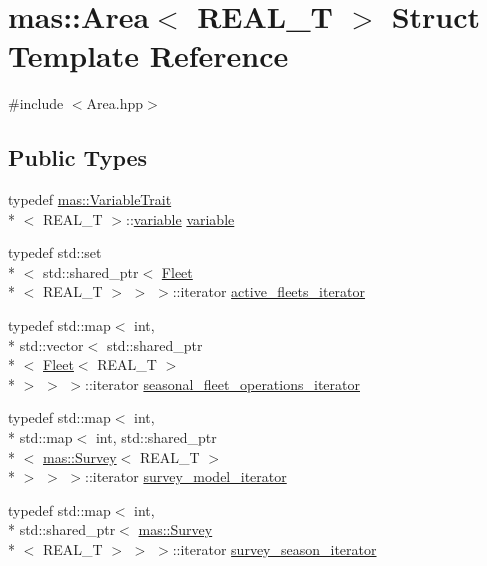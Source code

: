 \hypertarget{structmas_1_1_area}{\section{mas\-:\-:Area$<$ R\-E\-A\-L\-\_\-\-T $>$ Struct Template Reference}
\label{structmas_1_1_area}
}


{\ttfamily \#include $<$Area.\-hpp$>$}

\subsection*{Public Types}
\begin{DoxyCompactItemize}
\item 
typedef \hyperlink{structmas_1_1_variable_trait}{mas\-::\-Variable\-Trait}\\*
$<$ R\-E\-A\-L\-\_\-\-T $>$\-::\hyperlink{structmas_1_1_area_a3fb53ebc27c5323de15a81fbfbc7c878}{variable} \hyperlink{structmas_1_1_area_a3fb53ebc27c5323de15a81fbfbc7c878}{variable}
\item 
typedef std\-::set\\*
$<$ std\-::shared\-\_\-ptr$<$ \hyperlink{structmas_1_1_fleet}{Fleet}\\*
$<$ R\-E\-A\-L\-\_\-\-T $>$ $>$ $>$\-::iterator \hyperlink{structmas_1_1_area_afac4316f68a1431235c7d28968655ad7}{active\-\_\-fleets\-\_\-iterator}
\item 
typedef std\-::map$<$ int, \\*
std\-::vector$<$ std\-::shared\-\_\-ptr\\*
$<$ \hyperlink{structmas_1_1_fleet}{Fleet}$<$ R\-E\-A\-L\-\_\-\-T $>$\\*
 $>$ $>$ $>$\-::iterator \hyperlink{structmas_1_1_area_a93e43b48e01d6deb544629b9a16df074}{seasonal\-\_\-fleet\-\_\-operations\-\_\-iterator}
\item 
typedef std\-::map$<$ int, \\*
std\-::map$<$ int, std\-::shared\-\_\-ptr\\*
$<$ \hyperlink{structmas_1_1_survey}{mas\-::\-Survey}$<$ R\-E\-A\-L\-\_\-\-T $>$\\*
 $>$ $>$ $>$\-::iterator \hyperlink{structmas_1_1_area_ae1b22fac7afc3a1cd975eda651a4f635}{survey\-\_\-model\-\_\-iterator}
\item 
typedef std\-::map$<$ int, \\*
std\-::shared\-\_\-ptr$<$ \hyperlink{structmas_1_1_survey}{mas\-::\-Survey}\\*
$<$ R\-E\-A\-L\-\_\-\-T $>$ $>$ $>$\-::iterator \hyperlink{structmas_1_1_area_a406c0cf877a7c6b88586fa6da3108de2}{survey\-\_\-season\-\_\-iterator}
\end{DoxyCompactItemize}
